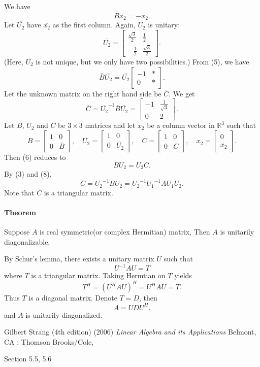 \documentclass{article}
\begin{document}
We have
\[\bar B\overline{x_2}=-\overline{x_2}.\tag{5}\]
Let $\overline{U_2}$ have $\overline{x_2}$ as the first column.
Again, $U_2$ is unitary:
\[\overline{U_2}=\begin{bmatrix}
\frac{\sqrt3}2	&\frac12\\
-\frac12		&\frac{\sqrt3}2
\end{bmatrix}.\]
(Here, $\overline{U_2}$ is not unique, but we only have two possibilities.)
From (5), we have
\[
\bar B\overline{U_2}=\overline{U_2}
\begin{bmatrix}
-1	&*\\
0	&*
\end{bmatrix}.\tag{6}
\]
Let the unknown matrix on the right hand side be $\bar C$.
We get
\[\bar C=\overline{U_2}^{-1}\bar B\overline{U_2}=\begin{bmatrix}
-1	&\frac1{\sqrt3}\\
0	&2
\end{bmatrix}.\]
Let $B$, $U_2$ and $C$ be $3\times 3$ matrices and let $x_2$ be a column vector in $\mathbb R^3$ such that
\[
B=\begin{bmatrix}
1&0\\0&\bar B
\end{bmatrix}
,\quad
U_2=\begin{bmatrix}
1&0\\0&\overline{U_2}
\end{bmatrix}
,\quad
C=\begin{bmatrix}
1&0\\0&\bar C
\end{bmatrix}
,\quad
x_2=\begin{bmatrix}
0\\\overline{x_2}
\end{bmatrix}.
\tag{7}\]
Then (6) reduces to
\[BU_2=U_2C.\tag{8}\]
By (3) and (8),
\[C={U_2}^{-1}BU_2={U_2}^{-1}{U_1}^{-1}AU_1U_2.\]
Note that $C$ is a triangular matrix.

\paragraph{Theorem}
Suppose $A$ is real symmetric(or complex Hermitian) matrix,
Then $A$ is unitarily diagonalizable.

\medskip
By Schur's lemma, there exists a unitary matrix $U$ such that
\[U^{-1}AU=T\]
where $T$ is a triangular matrix.
Taking Hermtian on $T$ yields
\[T^H=(U^HAU)^H=U^HAU=T.\]
Thus $T$ is a diagonal matrix.
Denote $T=D$, then
\[A=UD U^H.\]
and $A$ is unitarily diagonalized.

\begin{thebibliography}{9}
Gilbert Strang (4th edition) (2006) \textit{Linear Algebra and its Applications} Belmont, CA : Thomson Brooks/Cole,
\end{thebibliography}
Section 5.5, 5.6
\end{document}
